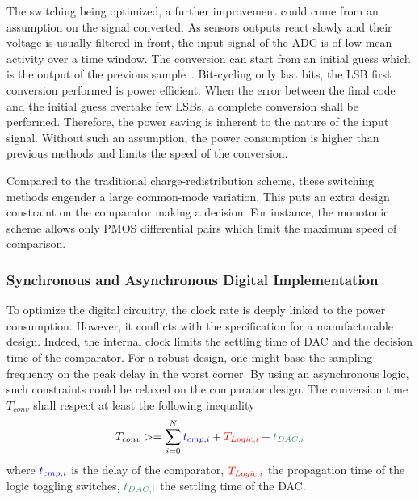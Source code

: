 The switching being optimized, a further improvement could come from an assumption on the signal converted. As sensors outputs react slowly and their voltage is usually filtered in front, the input signal of the ADC is of low mean activity over a time window. The conversion can start from an initial guess which is the output of the previous sample~\cite{Yaul2014}. Bit-cycling only last bits, the LSB first conversion performed is power efficient. When the error between the final code and the initial guess overtake few LSBs, a complete conversion shall be performed. Therefore, the power saving is inherent to the nature of the input signal. Without such an assumption, the power consumption is higher than previous methods and limits the speed of the conversion.

Compared to the traditional charge-redistribution scheme, these switching methods engender a large common-mode variation. This puts an extra design constraint on the comparator making a decision. For instance, the monotonic scheme allows only PMOS differential pairs which limit the maximum speed of comparison. 

\subsubsection{Synchronous and Asynchronous Digital Implementation}
To optimize the digital circuitry, the clock rate is deeply linked to the power consumption. However, it conflicts with the specification for a manufacturable design. Indeed, the internal clock limits the settling time of DAC and the decision time of the comparator. For a robust design, one might base the sampling frequency on the peak delay in the worst corner. By using an asynchronous logic, such constraints could be relaxed on the comparator design. The conversion time \(T_{conv}  \) shall respect at least the following inequality
\begin{equation}
\label{eqn:sar_async_conv}
T_{conv} >= \sum_{i=0}^N {\textcolor{blue}{t_{cmp, i}}+\textcolor{red}{T_{Logic, i}}+\textcolor{Xgreen}{t_{DAC, i}}}
\end{equation}
where \(\textcolor{blue}{t_{cmp, i}}\) is the delay of the comparator, \(\textcolor{red}{T_{Logic, i}}\) the propagation time of the logic toggling switches, \(\textcolor{Xgreen}{t_{DAC, i}}\) the settling time of the DAC\@.

